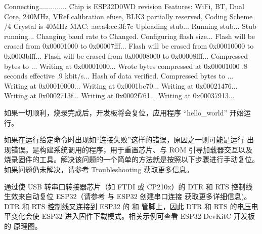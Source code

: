 \documentclass[a4paper,12pt,english]{sphinxmanual}
\begin{document}
\begin{sphinxVerbatim}[commandchars=\\\{\}]
Connecting..............
Chip is ESP32\PYGZhy{}D0WD revision 
Features: WiFi, BT, Dual Core, 240MHz, VRef calibration  efuse, BLK3 partially reserved, Coding Scheme /4
Crystal is 40MHz
MAC: :ae:a4:cc:3f:7c
Uploading stub...
Running stub...
Stub running...
Changing baud rate to 
Changed.
Configuring flash size...
Flash will be erased from 0x00001000 to 0x00007fff...
Flash will be erased from 0x00010000 to 0x0003bfff...
Flash will be erased from 0x00008000 to 0x00008fff...
Compressed  bytes to ...
Writing at 0x00001000...  \PYGZpc{}
Wrote  bytes  compressed at 0x00001000  .8 seconds effective .9 kbit/s...
Hash of data verified.
Compressed  bytes to ...
Writing at 0x00010000...  \PYGZpc{}
Writing at 0x0001bc70...  \PYGZpc{}
Writing at 0x00021476...  \PYGZpc{}
Writing at 0x0002713f...  \PYGZpc{}
Writing at 0x0002f761...  \PYGZpc{}
Writing at 0x00037913...  \PYGZpc{}
\end{sphinxVerbatim}

\sphinxAtStartPar
如果一切顺利，烧录完成后，开发板将会复位，应用程序 “hello\_world” 开始运行。

\sphinxAtStartPar
{}

\sphinxAtStartPar
如果在运行给定命令时出现如“连接失败”这样的错误，原因之一则可能是运行 出现错误。是构建系统调用的程序，用于重置芯片、与 ROM 引导加载器交互以及烧录固件的工具。解决该问题的一个简单的方法就是按照以下步骤进行手动复位。如果问题仍未解决，请参考 Troubleshooting 获取更多信息。

\sphinxAtStartPar
{}通过使 USB 转串口转接器芯片（如 FTDI 或 CP210x）的 DTR 和 RTS 控制线生效来自动复位 ESP32（请参考 与 ESP32 创建串口连接 获取更多详细信息)。DTR 和 RTS 控制线又连接到 ESP32 的 和 管脚上，因此 DTR 和 RTS 的电压电平变化会使 ESP32 进入固件下载模式。相关示例可查看 ESP32 DevKitC 开发板的 原理图。
\end{document}
